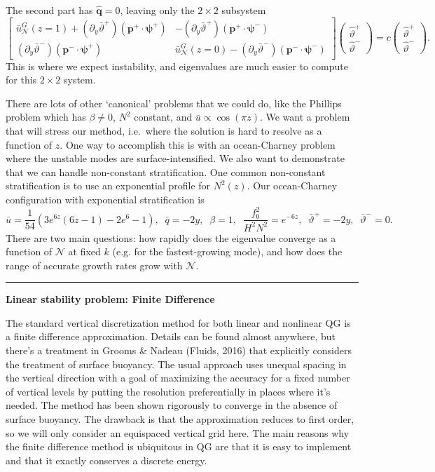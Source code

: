 \documentclass[10pt]{article}
\newcommand{\pd}[1]{\partial_{#1}}
\newcommand{\sN}{\mathcal{N}}
\begin{document}
The second part has $\hat{\bm{q}} = 0$, leaving only the $2\times 2$ subsystem
\begin{equation}
\left[\begin{array}{cc}
\bar{u}_\sN^G(z=1)+(\pd{y}\bar\vartheta^+)(\bm{p}^+\cdot\bm{\psi}^+) & -(\pd{y}\bar\vartheta^+)(\bm{p}^+\cdot\bm{\psi}^-)\\
 (\pd{y}\bar\vartheta^-)(\bm{p}^-\cdot\bm{\psi}^+)&\bar{u}_\sN^G(z=0)-(\pd{y}\bar\vartheta^-)(\bm{p}^-\cdot\bm{\psi}^-)
\end{array}\right]\left(\begin{array}{c}\hat{\vartheta}^+\\\hat{\vartheta}^-\end{array}\right) = c\left(\begin{array}{c}\hat{\vartheta}^+\\\hat{\vartheta}^-\end{array}\right).
\end{equation}
This is where we expect instability, and eigenvalues are much easier to compute for this $2\times2$ system.

\clearpage
{}
There are lots of other `canonical' problems that we could do, like the Phillips problem which has $\beta\neq0$, $N^2$ constant, and $\bar u\propto \cos(\pi z)$.
We want a problem that will stress our method, i.e.~where the solution is hard to resolve as a function of $z$.
One way to accomplish this is with an ocean-Charney problem where the unstable modes are surface-intensified.
We also want to demonstrate that we can handle non-constant stratification.
One common non-constant stratification is to use an exponential profile for $N^2(z)$.
Our ocean-Charney configuration with exponential stratification is
\[\bar u = \frac{1}{54} \left(3 e^{6 z} (6 z-1)-2 e^6-1\right), \;\;\bar{q} = -2y,\;\;\beta = 1,\;\;\frac{f_0^2}{H^2N^2} = e^{-6z},\;\;\bar\vartheta^+ = -2y,\;\;\bar{\vartheta}^-=0.\]
There are two main questions: how rapidly does the eigenvalue converge as a function of $\sN$ at fixed $k$ (e.g. for the fastest-growing mode), and how does the range of accurate growth rates grow with $\sN$.\\

\hrule
\begin{center}{\bf Linear stability problem: Finite Difference}\end{center}
The standard vertical discretization method for both linear and nonlinear QG is a finite difference approximation.
Details can be found almost anywhere, but there's a treatment in Grooms \& Nadeau (Fluids, 2016) that explicitly considers the treatment of surface buoyancy.
The usual approach uses unequal spacing in the vertical direction with a goal of maximizing the accuracy for a fixed number of vertical levels by putting the resolution preferentially in places where it's needed.
The method has been shown rigorously to converge in the absence of surface buoyancy.
The drawback is that the approximation reduces to first order, so we will only consider an equispaced vertical grid here.
The main reasons why the finite difference method is ubiquitous in QG are that it is easy to implement and that it exactly conserves a discrete energy.
\end{document}

